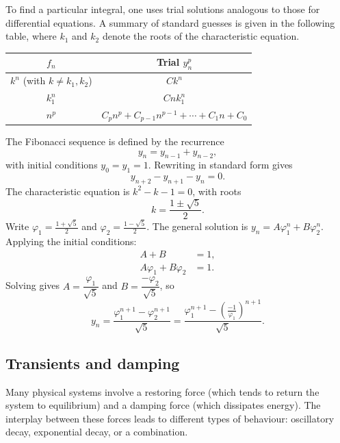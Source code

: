 \documentclass[a4paper]{article}
\begin{document}
\begin{remark}
  To find a particular integral, one uses trial solutions analogous to those for differential equations. A summary of standard guesses is given in the following table, where $k_1$ and $k_2$ denote the roots of the characteristic equation.
  \begin{center}
    \begin{tabular}{cc}
      \toprule
      $f_n$ & Trial $y_n^p$\\
      \midrule
      $k^n$ (with $k \neq k_1, k_2$) & $Ck^n$\\
      $k_1^n$ & $Cnk_1^n$\\
      $n^p$ & $C_pn^p + C_{p-1}n^{p - 1} + \cdots + C_1 n + C_0$\\
      \bottomrule
    \end{tabular}
  \end{center}
\end{remark}

\begin{eg}
  The Fibonacci sequence is defined by the recurrence
  \[
    y_n = y_{n-1} + y_{n-2},
  \]
  with initial conditions $y_0 = y_1 = 1$. Rewriting in standard form gives
  \[
    y_{n+2} - y_{n+1} - y_n = 0.
  \]
  The characteristic equation is $k^2 - k - 1 = 0$, with roots
  \[
    k = \frac{1 \pm \sqrt{5}}{2}.
  \]
  Write $\varphi_1 = \frac{1 + \sqrt{5}}{2}$ and $\varphi_2 = \frac{1 - \sqrt{5}}{2}$. The general solution is $y_n = A\varphi_1^n + B\varphi_2^n$. Applying the initial conditions:
  \begin{align*}
    A + B &= 1,\\
    A\varphi_1 + B\varphi_2 &= 1.
  \end{align*}
  Solving gives $A = \dfrac{\varphi_1}{\sqrt{5}}$ and $B = \dfrac{-\varphi_2}{\sqrt{5}}$, so
  \[
    y_n = \frac{\varphi_1^{n+1} - \varphi_2^{n+1}}{\sqrt{5}} = \frac{\varphi_1^{n+1} - \left(\frac{-1}{\varphi_1}\right)^{n+1}}{\sqrt{5}}.
  \]
\end{eg}

\subsection{Transients and damping}
\begin{remark}
  Many physical systems involve a restoring force (which tends to return the system to equilibrium) and a damping force (which dissipates energy). The interplay between these forces leads to different types of behaviour: oscillatory decay, exponential decay, or a combination.
\end{remark}
\end{document}
